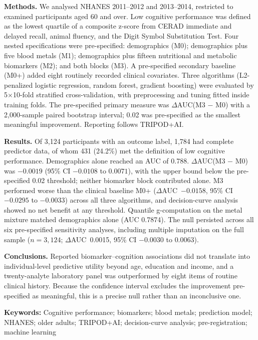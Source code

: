 \documentclass[12pt]{article}
\newcommand{\deltaauc}{$\Delta$AUC}
\begin{document}
\textbf{Methods.} We analysed NHANES 2011--2012 and 2013--2014, restricted to examined participants aged 60 and over. Low cognitive performance was defined as the lowest quartile of a composite z-score from CERAD immediate and delayed recall, animal fluency, and the Digit Symbol Substitution Test. Four nested specifications were pre-specified: demographics (M0); demographics plus five blood metals (M1); demographics plus fifteen nutritional and metabolic biomarkers (M2); and both blocks (M3). A pre-specified secondary baseline (M0+) added eight routinely recorded clinical covariates. Three algorithms (L2-penalized logistic regression, random forest, gradient boosting) were evaluated by 5$\times$10-fold stratified cross-validation, with preprocessing and tuning fitted inside training folds. The pre-specified primary measure was \deltaauc(M3 $-$ M0) with a 2,000-sample paired bootstrap interval; 0.02 was pre-specified as the smallest meaningful improvement. Reporting follows TRIPOD+AI.

\textbf{Results.} Of 3,124 participants with an outcome label, 1,784 had complete predictor data, of whom 431 (24.2\%) met the definition of low cognitive performance. Demographics alone reached an AUC of 0.788. \deltaauc(M3 $-$ M0) was $-0.0019$ (95\% CI $-0.0108$ to $0.0071$), with the upper bound below the pre-specified 0.02 threshold; neither biomarker block contributed alone. M3 performed worse than the clinical baseline M0+ (\deltaauc\ $-0.0158$, 95\% CI $-0.0295$ to $-0.0033$) across all three algorithms, and decision-curve analysis showed no net benefit at any threshold. Quantile g-computation on the metal mixture matched demographics alone (AUC 0.7874). The null persisted across all six pre-specified sensitivity analyses, including multiple imputation on the full sample ($n=3{,}124$; \deltaauc\ 0.0015, 95\% CI $-0.0030$ to $0.0063$).

\textbf{Conclusions.} Reported biomarker--cognition associations did not translate into individual-level predictive utility beyond age, education and income, and a twenty-analyte laboratory panel was outperformed by eight items of routine clinical history. Because the confidence interval excludes the improvement pre-specified as meaningful, this is a precise null rather than an inconclusive one.

\medskip
\noindent\textbf{Keywords:} Cognitive performance; biomarkers; blood metals; prediction model; NHANES; older adults; TRIPOD+AI; decision-curve analysis; pre-registration; machine learning
\end{document}
